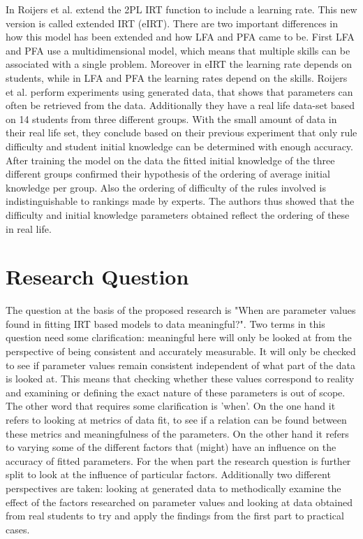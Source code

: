 \documentclass{scrartcl}
\begin{document}
In \cite{eirt} Roijers et al. extend the 2PL IRT function to include a learning rate. This new version is called extended IRT (eIRT). There are two important differences in how this model has been extended and how LFA and PFA came to be. First LFA and PFA use a multidimensional model, which means that multiple skills can be associated with a single problem. Moreover in eIRT the learning rate depends on students, while in LFA and PFA the learning rates depend on the skills. Roijers et al. perform experiments using generated data, that shows that parameters can often be retrieved from the data. Additionally they have a real life data-set based on 14 students from three different groups. With the small amount of data in their real life set, they conclude based on their previous experiment that only rule difficulty and student initial knowledge can be determined with enough accuracy. After training the model on the data the fitted initial knowledge of the three different groups confirmed their hypothesis of the ordering of average initial knowledge per group. Also the ordering of difficulty of the rules involved is indistinguishable to rankings made by experts. The authors thus showed that the difficulty and initial knowledge parameters obtained reflect the ordering of these in real life.


\section{Research Question}
\label{sec:RQ}
The question at the basis of the proposed research is "When are parameter values found in fitting IRT based models to data meaningful?". Two terms in this question need some clarification: meaningful here will only be looked at from the perspective of being consistent and accurately measurable. It will only be checked to see if parameter values remain consistent independent of what part of the data is looked at. This means that checking whether these values correspond to reality and examining or defining the exact nature of these parameters is out of scope. The other word that requires some clarification is 'when'. On the one hand it refers to looking at metrics of data fit, to see if a relation can be found between these metrics and meaningfulness of the parameters. On the other hand it refers to varying some of the different factors that (might) have an influence on the accuracy of fitted parameters. For the when part the research question is further split to look at the influence of particular factors. Additionally two different perspectives are taken: looking at generated data to methodically examine the effect of the factors researched on parameter values and looking at data obtained from real students to try and apply the findings from the first part to practical cases.
\end{document}
